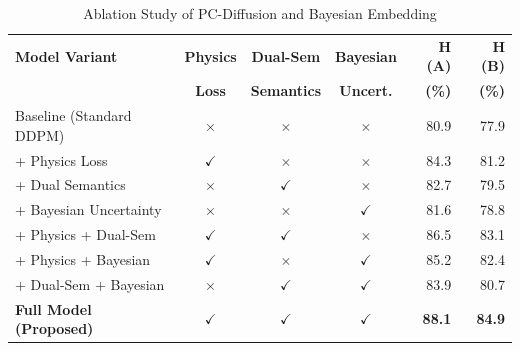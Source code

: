 \begin{table}[t]
\centering
\caption{Ablation Study of PC-Diffusion and Bayesian Embedding}
\label{tab:ablation}
\begin{tabular}{lcccrr}
\toprule
\textbf{Model Variant} & \textbf{Physics} & \textbf{Dual-Sem} & \textbf{Bayesian} & \textbf{H (A)} & \textbf{H (B)} \\
                       & \textbf{Loss} & \textbf{Semantics} & \textbf{Uncert.} & \textbf{(\%)} & \textbf{(\%)} \\
\midrule
Baseline (Standard DDPM) & $\times$ & $\times$ & $\times$ & 80.9 & 77.9 \\
+ Physics Loss & $\checkmark$ & $\times$ & $\times$ & 84.3 & 81.2 \\
+ Dual Semantics & $\times$ & $\checkmark$ & $\times$ & 82.7 & 79.5 \\
+ Bayesian Uncertainty & $\times$ & $\times$ & $\checkmark$ & 81.6 & 78.8 \\
+ Physics + Dual-Sem & $\checkmark$ & $\checkmark$ & $\times$ & 86.5 & 83.1 \\
+ Physics + Bayesian & $\checkmark$ & $\times$ & $\checkmark$ & 85.2 & 82.4 \\
+ Dual-Sem + Bayesian & $\times$ & $\checkmark$ & $\checkmark$ & 83.9 & 80.7 \\
\midrule
\textbf{Full Model (Proposed)} & $\checkmark$ & $\checkmark$ & $\checkmark$ & \textbf{88.1} & \textbf{84.9} \\
\bottomrule
\end{tabular}
\end{table}
